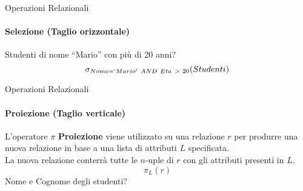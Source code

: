     \begin{frame}{Operazioni Relazionali}
        \framesubtitle{Selezione (Taglio orizzontale)}
        Studenti di nome ``Mario'' con pi\`u di 20 anni?
        \[\sigma_{Nome=`Mario'~AND~ Eta~>~20} (Studenti)\]
    \end{frame}
    \begin{frame}{Operazioni Relazionali}
        \framesubtitle{Proiezione (Taglio verticale)}
        L'operatore $\pi$ \textbf{Proiezione} viene utilizzato su una relazione $r$ per produrre una nuova relazione in base a una lista di attributi $L$ specificata.
        \\La nuova relazione conterr\`a tutte le $n$-uple di $r$ con gli attributi presenti in $L$.
        \[\pi_L (r)\]
        \vspace*{0.2cm}
         \centering Nome e Cognome degli studenti?
    \end{frame}
